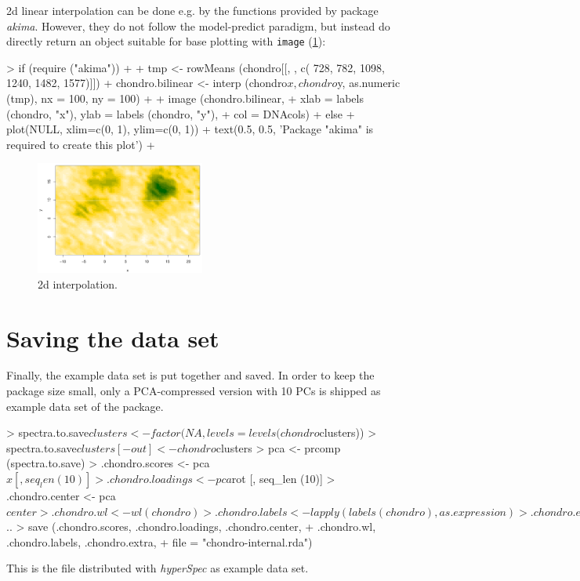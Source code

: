 \documentclass[english, a4paper, 10pt, headings=small, DIV11]{scrartcl}
\renewenvironment{Schunk}{\vspace{0pt}\begin{small}}{\end{small}\vspace{0pt}}
\newcommand{\Rfunction}[2][]{\texorpdfstring{\nohyphens{#1\texttt{#2}}}{#2}}
\newcommand{\Rpackage}[1]{\texorpdfstring{\nohyphens{\textit{#1}}}{#1}}
\newcommand{\phy}{\texorpdfstring{\nohyphens{\textit{hyperSpec}}}{hyperSpec}\xspace}
\begin{document}
2d linear interpolation can be done e.g. by the functions provided by package \Rpackage{akima}. However, they do not follow the model-predict paradigm, but instead do directly return an object suitable for base plotting with \Rfunction{image} (\ref{fig:akima}):

\begin{Schunk}
\begin{Sinput}
> if (require ("akima")){
+ 
+ tmp <- rowMeans (chondro[[, , c( 728, 782, 1098, 1240, 1482, 1577)]])
+ chondro.bilinear <- interp (chondro$x, chondro$y, as.numeric (tmp), nx = 100, ny = 100)
+ 
+ image (chondro.bilinear, 
+   xlab = labels (chondro, "x"), ylab = labels (chondro, "y"), 
+   col = DNAcols)
+ } else {
+   plot(NULL, xlim=c(0, 1), ylim=c(0, 1))
+   text(0.5, 0.5, 'Package "akima" is required to create this plot')
+ }
\end{Sinput}
\end{Schunk}
\begin{figure}[tbh]
\includegraphics[width=0.495\textwidth]{chondro-fig--DNAinterp}
\caption{\label{fig:akima} 2d interpolation.}
\end{figure}



\section{Saving the data set}
\label{sec:saving-data-set}

Finally, the example data set is put together and saved. In order to keep the package size small,
only a PCA-compressed version with 10 PCs is shipped as example data set of the package.
\begin{Schunk}
\begin{Sinput}
> spectra.to.save$clusters <- factor (NA, levels = levels (chondro$clusters))
> spectra.to.save$clusters[- out] <- chondro$clusters
> pca <- prcomp (spectra.to.save)
> .chondro.scores   <- pca$x      [, seq_len (10)]
> .chondro.loadings <- pca$rot    [, seq_len (10)]
> .chondro.center   <- pca$center
> .chondro.wl       <- wl (chondro)
> .chondro.labels   <- lapply (labels (chondro), as.expression)
> .chondro.extra    <- spectra.to.save$..
> save (.chondro.scores, .chondro.loadings, .chondro.center,
+       .chondro.wl, .chondro.labels, .chondro.extra,
+       file = "chondro-internal.rda")
\end{Sinput}
\end{Schunk}
This is the file distributed with \phy as example data set.
\end{document}
